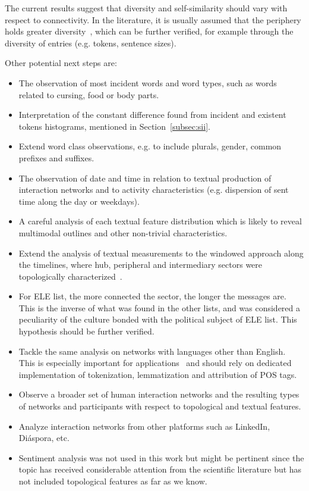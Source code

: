 The current results suggest that diversity and self-similarity should vary with respect to connectivity. In the literature, it is usually assumed 
that the periphery holds greater diversity~\cite{easly},
which can be further verified, for example through the diversity of entries (e.g. tokens, sentence sizes).

Other potential next steps are:
\begin{itemize}
\item The observation of most incident words and word types,
such as words related to cursing, food or body parts.
\item Interpretation of the constant difference found from incident and existent tokens histograms,
mentioned in Section~\ref{subsec:sii}.
\item Extend word class observations, e.g. to include plurals, gender, common prefixes and suffixes.
\item The observation of date and time in relation to textual production of interaction networks and
to activity characteristics (e.g. dispersion of sent time along the day or weekdays).
\item A careful analysis of each textual feature distribution which is likely to reveal multimodal outlines and other non-trivial characteristics.
\item Extend the analysis of textual measurements to the windowed approach along the timelines, where hub, peripheral and intermediary sectors were topologically characterized~\cite{stab}.
\item For ELE list, the more connected the sector, the longer the messages are.
This is the inverse of what was found in the other lists,
and was considered a peculiarity of the culture bonded with the political subject of ELE list.
This hypothesis should be further verified.
\item Tackle the same analysis on networks with languages other than English.
This is especially important for applications~\cite{ensaio}
and should rely on dedicated implementation of 
tokenization, lemmatization and attribution of POS tags.
\item Observe a broader set of human interaction networks and the resulting types
of networks and participants with respect to topological and textual features.
\item Analyze interaction networks from other platforms such as LinkedIn, Diáspora, etc.
\item Sentiment analysis was not used in this work but might be pertinent since the topic has received considerable attention from the scientific literature but has not included topological features as far as we know.

\end{itemize}
